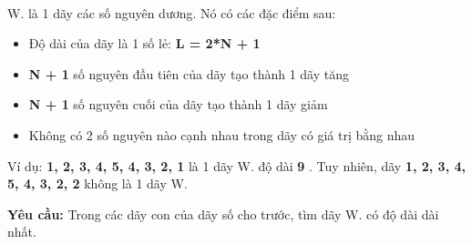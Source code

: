  

W. là 1 dãy các số nguyên dương. Nó có các đặc điểm sau:
\begin{itemize}
	\item Độ dài của dãy là 1 số lẻ: \textbf{ L = 2*N + 1 }
	\item \textbf{N + 1 } số nguyên đầu tiên của dãy tạo thành 1 dãy tăng
	\item \textbf{N + 1 } số nguyên cuối của dãy tạo thành 1 dãy giảm
	\item Không có 2 số nguyên nào cạnh nhau trong dãy có giá trị bằng nhau
\end{itemize}

Ví dụ: \textbf{ 1, 2, 3, 4, 5, 4, 3, 2, 1 } là 1 dãy W. độ dài \textbf{ 9 } . Tuy nhiên, dãy \textbf{ 1, 2, 3, 4, 5, 4, 3, 2, 2 } không là 1 dãy W.

\textbf{Yêu cầu: } Trong các dãy con của dãy số cho trước, tìm dãy W. có độ dài dài nhất.

\